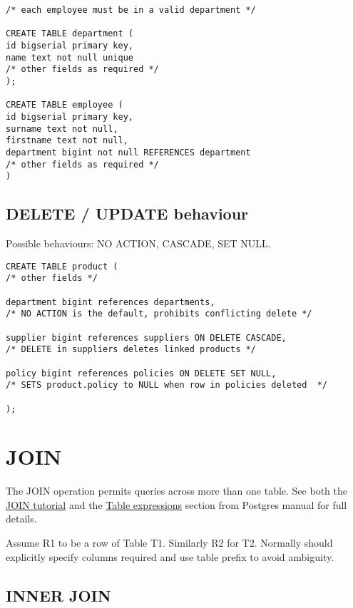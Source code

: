 \begin{verbatim}
/* each employee must be in a valid department */

CREATE TABLE department (
id bigserial primary key,
name text not null unique
/* other fields as required */
);

CREATE TABLE employee (
id bigserial primary key,
surname text not null,
firstname text not null,
department bigint not null REFERENCES department
/* other fields as required */
)
\end{verbatim}

\subsection{DELETE / UPDATE behaviour}\label{delete-update-behaviour}

Possible behaviours: NO ACTION, CASCADE, SET NULL.

\begin{verbatim}
CREATE TABLE product ( 
/* other fields */

department bigint references departments, 
/* NO ACTION is the default, prohibits conflicting delete */

supplier bigint references suppliers ON DELETE CASCADE,
/* DELETE in suppliers deletes linked products */

policy bigint references policies ON DELETE SET NULL,
/* SETS product.policy to NULL when row in policies deleted  */

);
\end{verbatim}

\section{JOIN}\label{join}

The JOIN operation permits queries across more than one table. See both
the
\href{https://www.postgresql.org/docs/current/tutorial-join.html}{JOIN
tutorial} and the
\href{https://www.postgresql.org/docs/13/queries-table-expressions.html}{Table
expressions} section from Postgres manual for full details.

Assume R1 to be a row of Table T1. Similarly R2 for T2. Normally should
explicitly specify columns required and use table prefix to avoid
ambiguity.

\subsection{INNER JOIN}\label{inner-join}

